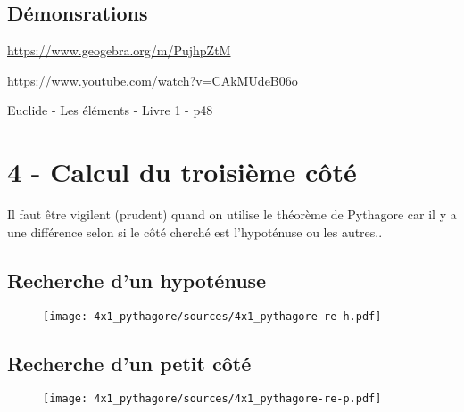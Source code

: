 \documentclass[11pt]{article}
\begin{document}
\subsection*{Démonsrations}

\url{https://www.geogebra.org/m/PujhpZtM}

\url{https://www.youtube.com/watch?v=CAkMUdeB06o}

Euclide - Les éléments - Livre 1 - p48


\section*{4 - Calcul du troisième côté}

Il faut être vigilent (prudent) quand on utilise le théorème de Pythagore car il y a une différence selon si le côté cherché est l'hypoténuse ou les autres..

\subsection*{Recherche d'un hypoténuse}

\begin{figure}[H]
    \centering
    \texttt{[image: 4x1\_pythagore/sources/4x1\_pythagore-re-h.pdf]}
\end{figure}

\subsection*{Recherche d'un petit côté}

\begin{figure}[H]
    \centering
    \texttt{[image: 4x1\_pythagore/sources/4x1\_pythagore-re-p.pdf]}
\end{figure}
\end{document}
